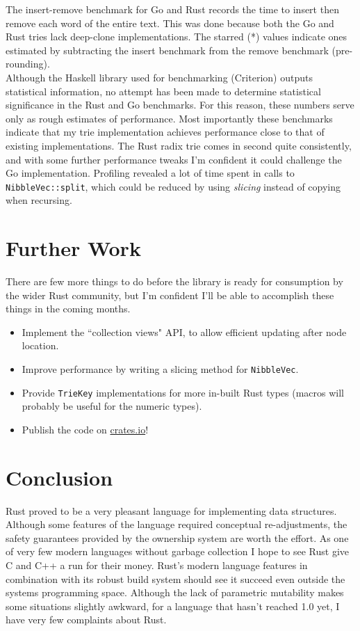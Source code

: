 \documentclass[a4paper,12pt]{article}
\newcommand{\code}{\texttt}
\begin{document}
The insert-remove benchmark for Go and Rust records the time to insert then remove each word of the entire text. This was done because both the Go and Rust tries lack deep-clone implementations. The starred (*) values indicate ones estimated by subtracting the insert benchmark from the remove benchmark (pre-rounding).\\

Although the Haskell library used for benchmarking (Criterion) outputs statistical information, no attempt has been made to determine statistical significance in the Rust and Go benchmarks. For this reason, these numbers serve only as rough estimates of performance. Most importantly these benchmarks indicate that my trie implementation achieves performance close to that of existing implementations. The Rust radix trie comes in second quite consistently, and with some further performance tweaks I'm confident it could challenge the Go implementation. Profiling revealed a lot of time spent in calls to \code{NibbleVec::split}, which could be reduced by using \textit{slicing} instead of copying when recursing.

\section{Further Work}

There are few more things to do before the library is ready for consumption by the wider Rust community, but I'm confident I'll be able to accomplish these things in the coming months.

\begin{itemize}
\item Implement the ``collection views" API, to allow efficient updating after node location.
\item Improve performance by writing a slicing method for \code{NibbleVec}.
\item Provide \code{TrieKey} implementations for more in-built Rust types (macros will probably be useful for the numeric types).
\item Publish the code on \url{crates.io}!
\end{itemize}

\section{Conclusion}

Rust proved to be a very pleasant language for implementing data structures. Although some features of the language required conceptual re-adjustments, the safety guarantees provided by the ownership system are worth the effort. As one of very few modern languages without garbage collection I hope to see Rust give C and C++ a run for their money. Rust's modern language features in combination with its robust build system should see it succeed even outside the systems programming space. Although the lack of parametric mutability makes some situations slightly awkward, for a language that hasn't reached 1.0 yet, I have very few complaints about Rust.
\end{document}
